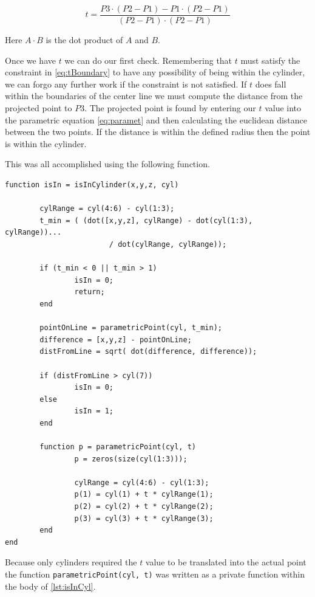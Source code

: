 \documentclass[authoryearcitations]{UoYCSproject}
\begin{document}
\begin{equation}
t = \frac{P3 \cdot (P2 - P1) - P1 \cdot (P2 - P1)}{(P2 - P1) \cdot (P2 - P1)}
\label{eq:dotProd}
\end{equation}

Here $A \cdot B$ is the dot product of $A$ and $B$. 

Once we have $t$ we can do our first check. Remembering that $t$ must satisfy the constraint in \ref{eq:tBoundary} 
to have any possibility
of being within the cylinder, we can forgo any further work if the constraint is not satisfied. If $t$ does fall within the
boundaries of the center line we must compute the distance from the projected point to $P3$. The projected point is
found by entering our $t$ value into the parametric equation \ref{eq:paramet} and then calculating the euclidean
distance between the two points. If the distance is within the defined radius then the point is within the cylinder. 

This was all accomplished using the following function. 


\begin{lstlisting}[caption={Finding if a point is within a cylinder}, label=lst:isInCyl]
function isIn = isInCylinder(x,y,z, cyl)
	
        cylRange = cyl(4:6) - cyl(1:3);
        t_min = ( (dot([x,y,z], cylRange) - dot(cyl(1:3), cylRange))... 
                        / dot(cylRange, cylRange));
        
        if (t_min < 0 || t_min > 1)
                isIn = 0;
                return;
        end
        
        pointOnLine = parametricPoint(cyl, t_min);
        difference = [x,y,z] - pointOnLine;
        distFromLine = sqrt( dot(difference, difference));
        
        if (distFromLine > cyl(7))
                isIn = 0;
        else
                isIn = 1;
        end

        function p = parametricPoint(cyl, t)
                p = zeros(size(cyl(1:3)));
                
                cylRange = cyl(4:6) - cyl(1:3);
                p(1) = cyl(1) + t * cylRange(1);
                p(2) = cyl(2) + t * cylRange(2);
                p(3) = cyl(3) + t * cylRange(3);
        end		
end
\end{lstlisting}

Because only cylinders required the $t$ value to be translated into the actual point the function 
\verb+parametricPoint(cyl, t)+ was written as a private function within the body of \ref{lst:isInCyl}.
\end{document}

